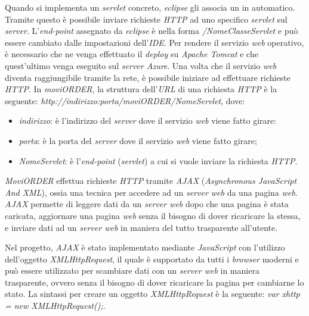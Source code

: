 Quando si implementa un \textit{servlet} concreto, \textit{eclipse} gli associa un  in automatico. Tramite questo è possibile inviare richieste \textit{HTTP} ad uno specifico \textit{servlet} sul \textit{server}. L'\textit{end-point} assegnato da \textit{eclipse} è nella forma \textit{/NomeClasseServlet} e può essere cambiato dalle impostazioni dell'\textit{IDE}. Per rendere il servizio \textit{web} operativo, è necessario che ne venga effettuato il \textit{deploy} su \textit{Apache Tomcat} e che quest'ultimo venga  eseguito sul \textit{server Azure}. Una volta che il servizio \textit{web} diventa raggiungibile tramite la rete, è possibile iniziare ad effettuare richieste \textit{HTTP}. In \textit{moviORDER}, la struttura dell'\textit{URL} di una richiesta \textit{HTTP} è la seguente: \textit{http://indirizzo:porta/moviORDER/NomeServlet}, dove:
\begin{itemize}
	\item \textit{indirizzo}: è l'indirizzo del \textit{server} dove il servizio \textit{web} viene fatto girare:
	\item \textit{porta}: è la porta del \textit{server} dove il servizio \textit{web} viene fatto girare;
	\item \textit{NomeServlet}: è l'\textit{end-point} (\textit{servlet}) a cui si vuole inviare la richiesta \textit{HTTP}.
\end{itemize}

\textit{MoviORDER} effettua richieste \textit{HTTP} tramite \textit{AJAX} (\textit{Asynchronous JavaScript And XML}), ossia una tecnica per accedere ad un \textit{server web} da una pagina \textit{web}. \textit{AJAX} permette di leggere dati da un \textit{server web} dopo che una pagina è stata caricata, aggiornare una pagina \textit{web} senza il bisogno di dover ricaricare la stessa, e inviare dati ad un \textit{server web} in maniera del tutto trasparente all'utente. 

Nel progetto, \textit{AJAX} è stato implementato mediante \textit{JavaScript} con l'utilizzo dell'oggetto \textit{XMLHttpRequest}, il quale è supportato da tutti i \textit{browser} moderni e può essere utilizzato per scambiare dati con un \textit{server web} in maniera trasparente, ovvero senza il bisogno di dover ricaricare la pagina per cambiarne lo stato. La sintassi per creare un oggetto \textit{XMLHttpRequest} è la seguente:
\textit{var xhttp = new XMLHttpRequest();}. 

